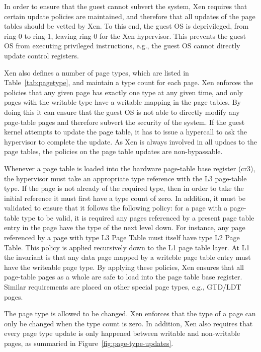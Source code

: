 In order to ensure that the guest cannot subvert the system, Xen requires that certain update policies are maintained, 
and therefore that all updates of the page tables should be vetted by Xen. 
To this end, the guest OS is deprivileged, from ring-0 to ring-1, leaving ring-0 for the Xen hypervisor.
This prevents the guest OS from executing privileged instructions, e.g., the guest OS cannot directly update control registers.

Xen also defines a number of page types, which are listed in Table~\ref{tab:pagetype}, and maintain a type count for each page.
Xen enforces the policies that any given page has exactly one type at any given time, 
and only pages with the writable type have a writable mapping in the page tables. 
By doing this it can ensure that the guest OS is not able to directly modify any page-table pages and therefore subvert the security of the system.
If the guest kernel attempts to update the page table, it has to issue a hypercall to ask the hypervisor to complete the update.
As Xen is always involved in all updaes to the page tables, the policies on the page table updates are non-bypassable.

Whenever a page table is loaded into the hardware page-table base register (cr3), 
the hypervisor must take an appropriate type reference with the L3 page-table type.
If the page is not already of the required type, then in order to take the initial reference it must first have a type count of zero.
In addition, it must be validated to ensure that it follows the following policy: 
for a page with a page-table type to be valid, it is required any pages referenced 
by a present page table entry in the page have the type of the next level down. 
For instance, any page referenced by a page with type L3 Page Table must itself have type L2 Page Table. 
This policy is applied recursively down to the L1 page table layer. 
At L1 the invariant is that any data page mapped by a writeble page table entry must have the writeable page type.
By applying these policies, Xen ensures that all page-table pages as a whole are safe to load into the page table base register.
Similar requirements are placed on other special page types, e.g., GTD/LDT pages.

The page type is allowed to be changed. 
Xen enforces that the type of a page can only be changed when the type count is zero.  
In addition, Xen also requires that every page type update is only happened between writable and non-writable pages, as summaried in Figure~\ref{fig:page-type-updates}.

